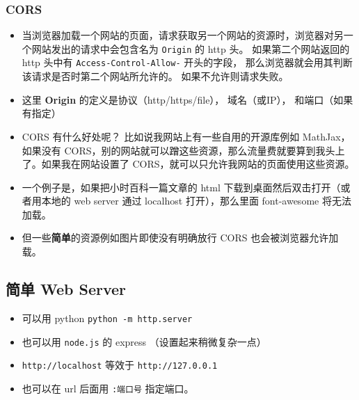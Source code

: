 \subsubsection{CORS}
\begin{itemize}
\item 当浏览器加载一个网站的页面，请求获取另一个网站的资源时，浏览器对另一个网站发出的请求中会包含名为 \verb`Origin` 的 http 头。 如果第二个网站返回的 http 头中有 \verb`Access-Control-Allow-` 开头的字段， 那么浏览器就会用其判断该请求是否时第二个网站所允许的。 如果不允许则请求失败。
\item 这里 \textbf{Origin} 的定义是协议（http/https/file）， 域名（或IP）， 和端口（如果有指定）
\item CORS 有什么好处呢？ 比如说我网站上有一些自用的开源库例如 MathJax，如果没有 CORS，别的网站就可以蹭这些资源，那么流量费就要算到我头上了。如果我在网站设置了 CORS，就可以只允许我网站的页面使用这些资源。
\item 一个例子是，如果把小时百科一篇文章的 html 下载到桌面然后双击打开（或者用本地的 web server 通过 localhost 打开），那么里面 font-awesome 将无法加载。
\item 但一些\textbf{简单}的资源例如图片即使没有明确放行 CORS 也会被浏览器允许加载。
\end{itemize}

\subsection{简单 Web Server}
\begin{itemize}
\item 可以用 python \verb`python -m http.server`
\item 也可以用 \verb`node.js` 的 express （设置起来稍微复杂一点）
\item \verb`http://localhost` 等效于 \verb`http://127.0.0.1`
\item 也可以在 url 后面用 \verb`:端口号` 指定端口。
\end{itemize}
